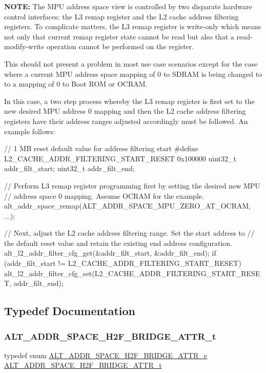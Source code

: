 {\bfseries{N\+O\+TE\+:}} The M\+PU address space view is controlled by two disparate hardware control interfaces\+: the L3 remap register and the L2 cache address filtering registers. To complicate matters, the L3 remap register is write-\/only which means not only that current remap register state cannot be read but also that a read-\/modify-\/write operation cannot be performed on the register.

This should not present a problem in most use case scenarios except for the case where a current M\+PU address space mapping of 0 to S\+D\+R\+AM is being changed to to a mapping of 0 to Boot R\+OM or O\+C\+R\+AM.

In this case, a two step process whereby the L3 remap register is first set to the new desired M\+PU address 0 mapping and then the L2 cache address filtering registers have their address ranges adjusted accordingly must be followed. An example follows\+: \begin{DoxyVerb}// 1 MB reset default value for address filtering start
#define L2_CACHE_ADDR_FILTERING_START_RESET     0x100000
uint32_t addr_filt_start;
uint32_t addr_filt_end;

// Perform L3 remap register programming first by setting the desired new MPU
// address space 0 mapping. Assume OCRAM for the example.
alt_addr_space_remap(ALT_ADDR_SPACE_MPU_ZERO_AT_OCRAM, ...);

// Next, adjust the L2 cache address filtering range. Set the start address to
// the default reset value and retain the existing end address configuration.
alt_l2_addr_filter_cfg_get(&addr_filt_start, &addr_filt_end);
if (addr_filt_start != L2_CACHE_ADDR_FILTERING_START_RESET)
{
    alt_l2_addr_filter_cfg_set(L2_CACHE_ADDR_FILTERING_START_RESET, addr_filt_end);
}
\end{DoxyVerb}
 

\subsection{Typedef Documentation}
\mbox{\label{group__ADDR__SPACE__MGR__REMAP_gae53e07cd2bd2dec130fa387c5242b8bd}} 
\subsubsection{\texorpdfstring{ALT\_ADDR\_SPACE\_H2F\_BRIDGE\_ATTR\_t}{ALT\_ADDR\_SPACE\_H2F\_BRIDGE\_ATTR\_t}}
{\footnotesize\ttfamily typedef enum \mbox{\hyperlink{group__ADDR__SPACE__MGR__REMAP_ga590307e85b3ad755df3f95dbb63f5f34}{A\+L\+T\+\_\+\+A\+D\+D\+R\+\_\+\+S\+P\+A\+C\+E\+\_\+\+H2\+F\+\_\+\+B\+R\+I\+D\+G\+E\+\_\+\+A\+T\+T\+R\+\_\+e}}  \mbox{\hyperlink{group__ADDR__SPACE__MGR__REMAP_gae53e07cd2bd2dec130fa387c5242b8bd}{A\+L\+T\+\_\+\+A\+D\+D\+R\+\_\+\+S\+P\+A\+C\+E\+\_\+\+H2\+F\+\_\+\+B\+R\+I\+D\+G\+E\+\_\+\+A\+T\+T\+R\+\_\+t}}}

